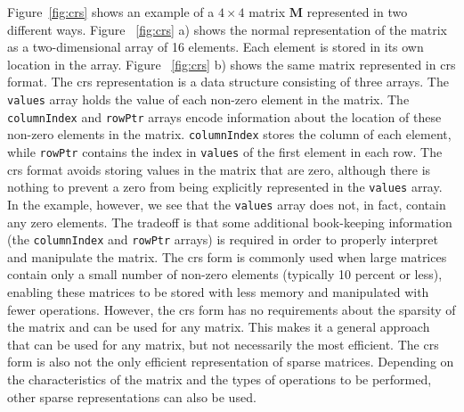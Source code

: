 Figure~\ref{fig:crs} shows an example of a $4 \times 4$ matrix $\mathbf{M}$ represented in two different ways.  Figure ~\ref{fig:crs} a) shows the normal representation of the matrix as a two-dimensional array of 16 elements.  Each element is stored in its own location in the array.  Figure ~\ref{fig:crs} b) shows the same matrix represented in \gls{crs} format.   The \gls{crs} representation is a data structure consisting of three arrays.  The \lstinline{values} array holds the value of each non-zero element in the matrix. The \lstinline{columnIndex} and \lstinline{rowPtr} arrays encode information about the location of these non-zero elements in the matrix. \lstinline{columnIndex} stores the column of each element, while \lstinline{rowPtr} contains the index in \lstinline|values| of the first element in each row. The \gls{crs} format avoids storing values in the matrix that are zero, although there is nothing to prevent a zero from being explicitly represented in the \lstinline|values| array.  In the example, however, we see that the \lstinline|values| array does not, in fact, contain any zero elements.  The tradeoff is that some additional book-keeping information (the \lstinline|columnIndex| and \lstinline|rowPtr| arrays) is required in order to properly interpret and manipulate the matrix.  The \gls{crs} form is commonly used when large matrices contain only a small number of non-zero elements (typically 10 percent or less), enabling these matrices to be stored with less memory and manipulated with fewer operations. However, the \gls{crs} form has no requirements about the sparsity of the matrix and can be used for any matrix. This makes it a general approach that can be used for any matrix, but not necessarily the most efficient.  The \gls{crs} form is also not the only efficient representation of sparse matrices.  Depending on the characteristics of the matrix and the types of operations to be performed, other sparse representations can also be used.

